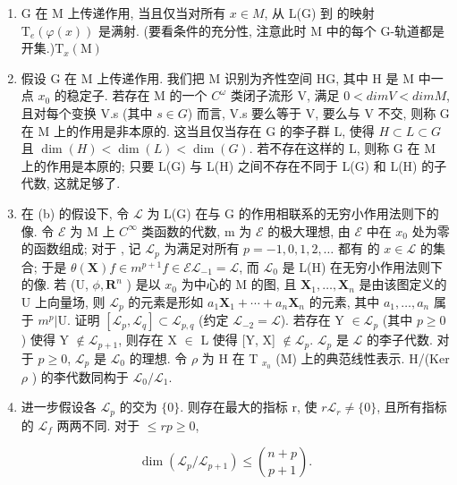 \begin{enumerate}
\def\labelenumi{(\alph{enumi})}
\item
  G 在 M 上传递作用, 当且仅当对所有 \(x \in M\), 从 L(G) 到  的映射 \(\mathrm{T}_{e}(\varphi(x))\) 是满射. (要看条件的充分性, 注意此时 M 中的每个 G-轨道都是开集.)\(\mathrm{T}_{x}(\mathrm{M})\)
\item
  假设 G 在 M 上传递作用. 我们把 M 识别为齐性空间 H\textbar G, 其中 H 是 M 中一点 \(x_{0}\) 的稳定子. 若存在 M 的一个 \(C^{\omega}\) 类闭子流形 V, 满足 \(0 < dim V < dim M\), 且对每个变换 V.s (其中 \(s \in G\)) 而言, V.s 要么等于 V, 要么与 V 不交, 则称 G 在 M 上的作用是非本原的. 这当且仅当存在 G 的李子群 L, 使得 \(H \subset L \subset G\) 且 \(\dim(H) < \dim(L) < \dim(G)\). 若不存在这样的 L, 则称 G 在 M 上的作用是本原的; 只要 L(G) 与 L(H) 之间不存在不同于 L(G) 和 L(H) 的子代数, 这就足够了.
\item
  在 (b) 的假设下, 令 \(\mathcal{L}\) 为 L(G) 在与 G 的作用相联系的无穷小作用法则下的像. 令 \(\mathcal{E}\) 为 M 上 \(C^\infty\) 类函数的代数, m 为 \(\mathcal{E}\) 的极大理想, 由 \(\mathcal{E}\) 中在 \(x_0\) 处为零的函数组成; 对于 , 记 \(\mathcal{L}_p\) 为满足对所有 \(p = -1, 0, 1, 2, \ldots\) 都有  的 \(x \in \mathcal{L}\) 的集合; 于是 \(\theta(\mathbf{X}) f \in m^{p+1}\)\(f \in \mathcal{E}\)\(\mathcal{L}_{-1} = \mathcal{L}\), 而 \(\mathcal{L}_0\) 是 L(H) 在无穷小作用法则下的像. 若 (U, \(\phi, \mathbf{R}^n\) ) 是以 \(x_0\) 为中心的 M 的图, 且 \(\mathbf{X}_1, \ldots, \mathbf{X}_n\) 是由该图定义的 U 上向量场, 则 \(\mathcal{L}_p\) 的元素是形如 \(a_1\mathbf{X}_1 + \cdots + a_n\mathbf{X}_n\) 的元素, 其中 \(a_1, \ldots, a_n\) 属于 \(m^p|\text{U}\). 证明 \([\mathcal{L}_p, \mathcal{L}_q] \subset \mathcal{L}_{p,q}\) (约定 \(\mathcal{L}_{-2} = \mathcal{L}\)). 若存在 Y \(\in \mathcal{L}_p\) (其中 \(p \geqslant 0\)) 使得 Y \(\notin \mathcal{L}_{p+1}\), 则存在 X \(\in\) L 使得 {[}Y, X{]} \(\notin \mathcal{L}_p\). \(\mathcal{L}_p\) 是 \(\mathcal{L}\) 的李子代数. 对于 \(p \geqslant 0\), \(\mathcal{L}_p\) 是 \(\mathcal{L}_0\) 的理想. 令 \(\rho\) 为 H 在 T \(_{x_0}\) (M) 上的典范线性表示. H/(Ker \(\rho\) ) 的李代数同构于 \(\mathcal{L}_0/\mathcal{L}_1\).
\item
  进一步假设各 \(\mathcal{L}_p\) 的交为 \(\{0\}\). 则存在最大的指标 r, 使 \(r\)\(\mathcal{L}_r \neq \{0\}\), 且所有指标  的 \(\mathcal{L}_f\) 两两不同. 对于 \(\leqslant r\)\(p \geqslant 0\),
\end{enumerate}

\[
\dim (\mathcal {L} _ {p} / \mathcal {L} _ {p + 1}) \leqslant \binom {n + p} {p + 1}.
\]

